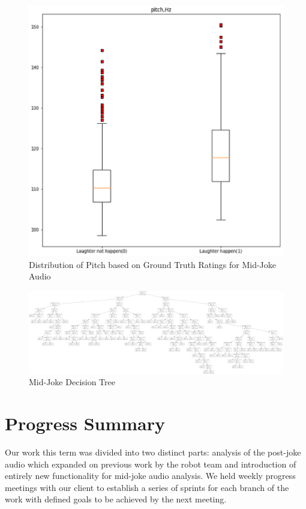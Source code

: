 \documentclass[onecolumn, draftclsnofoot,10pt, compsoc]{IEEEtran}
\begin{document}
\begin{figure}[!h]
\includegraphics{assets/fig21.eps}
\caption{Distribution of Pitch based on Ground Truth Ratings for Mid-Joke Audio}
\end{figure}

\begin{figure}[!h]
\includegraphics[width=\linewidth]{assets/fig22.eps}
\caption{Mid-Joke Decision Tree}
\end{figure}
\clearpage

\section{Progress Summary}
Our work this term was divided into two distinct parts: analysis of the post-joke audio which expanded on previous work by the robot team and introduction of entirely new functionality for mid-joke audio analysis. We held weekly progress meetings with our client to establish a series of sprints for each branch of the work with defined goals to be achieved by the next meeting.
\end{document}
